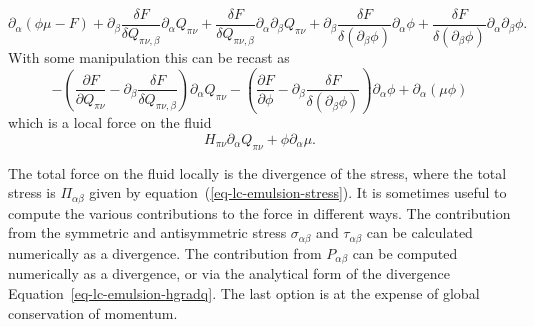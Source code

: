 \begin{equation}
\partial_{\alpha}\left(\phi\mu - F\right)
+\partial_{\beta}\frac{\delta F}{\delta Q_{\pi\nu,\beta}}
 \partial_{\alpha} Q_{\pi\nu}
+\frac{\delta F}{\delta Q_{\pi\nu,\beta}} \partial_{\alpha}\partial_{\beta}
 Q_{\pi\nu}
+\partial_{\beta} \frac{\delta F}{\delta \left(\partial_{\beta}\phi\right)}\partial_{\alpha}\phi
+\frac{\delta F}{\delta \left(\partial_{\beta}\phi\right)}\partial_{\alpha}\partial_{\beta}\phi.
\nonumber
\end{equation}
With some manipulation this can be recast as 
\begin{equation}
-\left( \frac{\partial F}{\partial Q_{\pi\nu}} 
       - \partial_{\beta}\frac{\delta F}{\delta Q_{\pi\nu,\beta}}
 \right) \partial_{\alpha}Q_{\pi\nu}
- \left(\frac{\partial F}{\partial\phi} 
- \partial_{\beta} \frac{\delta F}{\delta \left(\partial_{\beta}\phi\right)}\right)\partial_{\alpha}\phi + \partial_{\alpha}\left(\mu\phi\right)
\nonumber
\end{equation}
which is a local force on the fluid
\begin{equation}
\label{eq-lc-emulsion-hgradq}
H_{\pi\nu} \partial_{\alpha} Q_{\pi\nu} + \phi \partial_{\alpha}\mu.
\end{equation}

The total force on the fluid locally is the divergence of the stress,
where the total stress is $\Pi_{\alpha\beta}$
given by equation~(\ref{eq-lc-emulsion-stress}).
It is sometimes useful to compute the various contributions to the
force in different ways. The contribution from the symmetric and
antisymmetric stress $\sigma_{\alpha\beta}$ and  $\tau_{\alpha\beta}$
can be calculated numerically as a divergence. The contribution from
$P_{\alpha\beta}$ can be computed numerically as a divergence, or via the
analytical form of the divergence Equation~\ref{eq-lc-emulsion-hgradq}.
The  last option is
at the expense of global conservation of momentum.


\vfill
\pagebreak
